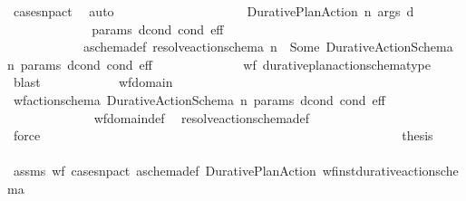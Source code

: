 \begin{isabellebody}
\ case{\isacharunderscore}{\kern0pt}snp{\isacharunderscore}{\kern0pt}act\ \isamarkupfalse%
\ auto\isanewline
\ \ \ \ \ \ \ \ \isamarkupfalse%
\isanewline
\ \ \ \ \ \ \ \ \ \ \isamarkupfalse%
\ {\isacharparenleft}{\kern0pt}Durative{\isacharunderscore}{\kern0pt}Plan{\isacharunderscore}{\kern0pt}Action\ n\ args\ d{\isacharparenright}{\kern0pt}\isanewline
\ \ \ \ \ \ \ \ \ \ \isamarkupfalse%
\ \isamarkupfalse%
\ params\ dcond\ cond\ eff\ \ \isanewline
\ \ \ \ \ \ \ \ \ \ \ \ a\isactrlsub s\isactrlsub c\isactrlsub h\isactrlsub e\isactrlsub m\isactrlsub a{\isacharunderscore}{\kern0pt}def{\isacharcolon}{\kern0pt}\ {\isachardoublequoteopen}resolve{\isacharunderscore}{\kern0pt}action{\isacharunderscore}{\kern0pt}schema\ n\ {\isacharequal}{\kern0pt}\ Some\ {\isacharparenleft}{\kern0pt}Durative{\isacharunderscore}{\kern0pt}Action{\isacharunderscore}{\kern0pt}Schema\ n\ params\ dcond\ cond\ eff{\isacharparenright}{\kern0pt}{\isachardoublequoteclose}\isanewline
\ \ \ \ \ \ \ \ \ \ \ \ \isamarkupfalse%
\ wf{\isacharunderscore}{\kern0pt}{\isasympi}\ durative{\isacharunderscore}{\kern0pt}plan{\isacharunderscore}{\kern0pt}action{\isacharunderscore}{\kern0pt}schema{\isacharunderscore}{\kern0pt}type{}\ \isamarkupfalse%
\ blast\isanewline
\ \ \ \ \ \ \ \ \ \ \isamarkupfalse%
\ wf{\isacharunderscore}{\kern0pt}domain\ \isamarkupfalse%
\ {\isachardoublequoteopen}wf{\isacharunderscore}{\kern0pt}action{\isacharunderscore}{\kern0pt}schema\ {\isacharparenleft}{\kern0pt}Durative{\isacharunderscore}{\kern0pt}Action{\isacharunderscore}{\kern0pt}Schema\ n\ params\ dcond\ cond\ eff{\isacharparenright}{\kern0pt}{\isachardoublequoteclose}\isanewline
\ \ \ \ \ \ \ \ \ \ \ \ \isamarkupfalse%
\ wf{\isacharunderscore}{\kern0pt}domain{\isacharunderscore}{\kern0pt}def\ \isamarkupfalse%
\ resolve{\isacharunderscore}{\kern0pt}action{\isacharunderscore}{\kern0pt}schema{\isacharunderscore}{\kern0pt}def\ \isamarkupfalse%
\ force\ \ \ \ \ \ \ \ \ \ \ \ \ \ \ \ \ \ \ \ \ \ \ \ \ \ \ \ \ \ \ \ \ \ \ \ \ \ \ \ \ \ \ \isanewline
\ \ \ \ \ \ \ \ \ \ \isamarkupfalse%
\ \isamarkupfalse%
\ {\isacharquery}{\kern0pt}thesis\isanewline
\ \ \ \ \ \ \ \ \ \ \ \ \isamarkupfalse%
\ assms\ wf{\isacharunderscore}{\kern0pt}{\isasympi}\ case{\isacharunderscore}{\kern0pt}snp{\isacharunderscore}{\kern0pt}act\ a\isactrlsub s\isactrlsub c\isactrlsub h\isactrlsub e\isactrlsub m\isactrlsub a{\isacharunderscore}{\kern0pt}def\ Durative{\isacharunderscore}{\kern0pt}Plan{\isacharunderscore}{\kern0pt}Action\ wf{\isacharunderscore}{\kern0pt}inst{\isacharunderscore}{\kern0pt}durative{\isacharunderscore}{\kern0pt}action{\isacharunderscore}{\kern0pt}schema\isanewline

\end{isabellebody}
